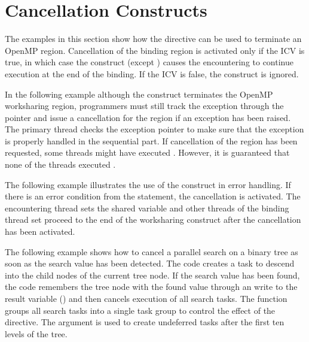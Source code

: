 \section{Cancellation Constructs}
\label{sec:cancellation}

The examples in this section show how the  directive can be used to terminate 
an OpenMP region. Cancellation of the binding region is activated only if the  ICV 
is true, in which case the  construct (except ) causes the encountering 
 to continue execution at the end of the binding. If the  ICV is false, the 
 construct is ignored.


In the following example although the  construct terminates the OpenMP 
worksharing region, programmers must still track the exception through the pointer 
 and issue a cancellation for the  region if an exception has
been raised. The primary thread checks the exception pointer to make sure that the 
exception is properly handled in the sequential part. If cancellation of the  
region has been requested, some threads might have executed . 
However, it is guaranteed that none of the threads executed .



The following example illustrates the use of the  construct in error 
handling. If there is an error condition from the  statement, 
the cancellation is activated. The encountering thread sets the shared variable 
 and other threads of the binding thread set proceed to the end of 
the worksharing construct after the cancellation has been activated. 


The following example shows how to cancel a parallel search on a binary tree as 
soon as the search value has been detected. The code creates a task to descend 
into the child nodes of the current tree node. If the search value has been found, 
the code remembers the tree node with the found value through an  
write to the result variable () and then cancels execution of all search tasks. The
function  groups all search tasks into a single 
task group to control the effect of the  directive. The 
 argument is used to create undeferred tasks after the first ten 
levels of the tree.


